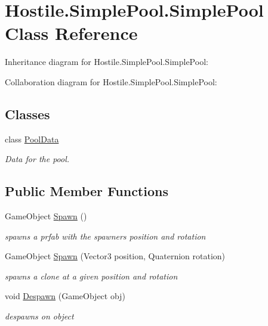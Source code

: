 \hypertarget{class_hostile_1_1_simple_pool_1_1_simple_pool}{\section{Hostile.\-Simple\-Pool.\-Simple\-Pool Class Reference}
\label{class_hostile_1_1_simple_pool_1_1_simple_pool}
}


Inheritance diagram for Hostile.\-Simple\-Pool.\-Simple\-Pool\-:


Collaboration diagram for Hostile.\-Simple\-Pool.\-Simple\-Pool\-:
\subsection*{Classes}
\begin{DoxyCompactItemize}
\item 
class \hyperlink{class_hostile_1_1_simple_pool_1_1_simple_pool_1_1_pool_data}{Pool\-Data}
\begin{DoxyCompactList}\small\item\em Data for the pool. \end{DoxyCompactList}\end{DoxyCompactItemize}
\subsection*{Public Member Functions}
\begin{DoxyCompactItemize}
\item 
Game\-Object \hyperlink{class_hostile_1_1_simple_pool_1_1_simple_pool_a89a49eec243206e1cc526350bac8c035}{Spawn} ()
\begin{DoxyCompactList}\small\item\em spawns a prfab with the spawners position and rotation \end{DoxyCompactList}\item 
Game\-Object \hyperlink{class_hostile_1_1_simple_pool_1_1_simple_pool_a06cf8f3d86eb820d88c1ad8070ef8d70}{Spawn} (Vector3 position, Quaternion rotation)
\begin{DoxyCompactList}\small\item\em spawns a clone at a given position and rotation \end{DoxyCompactList}\item 
void \hyperlink{class_hostile_1_1_simple_pool_1_1_simple_pool_a2ab6def34c89950533d31e65306ec48f}{Despawn} (Game\-Object obj)
\begin{DoxyCompactList}\small\item\em despawns on object \end{DoxyCompactList}\end{DoxyCompactItemize}
